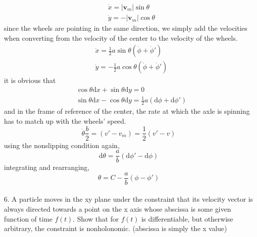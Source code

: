 \documentclass[]{article}
\numberwithin{equation}{section}
\begin{document}
\begin{align*}
	&\dot x=|\mathbf v_m|\sin\theta\\
	&\dot y=-|\mathbf v_m|\cos\theta
\end{align*}
since the wheels are pointing in the same direction, we simply add the velocities when converting from the velocity of the center to the velocity of the wheels.
\begin{align*}
	&\dot x=\frac 12a\sin\theta (\dot\phi+\dot\phi')\\
	&\dot y=-\frac 12a\cos\theta (\dot\phi+\dot\phi')
\end{align*}
it is obvious that 
\begin{align*}
	&\cos\theta\mathrm dx+\sin\theta\mathrm dy=0\\
	&\sin\theta\mathrm dx-\cos\theta\mathrm dy=\frac 12a(\mathrm d\phi+\mathrm d\phi')
\end{align*}
and in the frame of reference of the center, the rate at which the axle is spinning has to match up with the wheels' speed.
$$\dot\theta\frac b2=(v'-v_{m})=\frac 12(v'-v)$$
using the nonslipping condition again,
$$\mathrm d\theta=\frac ab(\mathrm d\phi'-\mathrm d\phi)$$
integrating and rearranging,
$$\theta=C-\frac ab(\phi-\phi')$$\\
6. A particle moves in the xy plane under the constraint that its velocity vector is always directed towards a point on the x axis whose abscissa is some given function of time $f(t)$. Show that for $f(t)$ is differentiable, but otherwise arbitrary, the constraint is nonholonomic.  (abscissa is simply the x value)\\
\end{document}
